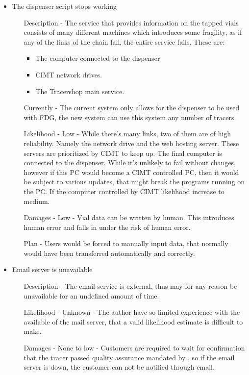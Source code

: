 \documentclass{article}
\begin{document}
\begin{itemize}
\begin{itemize}
  \end{itemize}
  \item The dispenser script stops working
  \begin{itemize}
    \item[Description] - The service that provides information on the tapped
    vials consists of many different machines which introduces some fragility,
    as if any of the links of the chain fail, the entire service fails.
    These are:
    \begin{itemize}
      \item The computer connected to the dispenser
      \item CIMT network drives.
      \item The Tracershop main service.
    \end{itemize}
    \item[Currently] - The current system only allows for the dispenser to be
    used with FDG, the new system can use this system any number of tracers.
    \item[Likelihood] - Low - While there's many links, two of them are of high
    reliability. Namely the network drive and the web hosting server. These
    servers are prioritized by CIMT to keep up.
    The final computer is connected to the dispenser. While it's unlikely to
    fail without changes, however if this PC would become a CIMT controlled PC,
    then it would be subject to various updates, that might break the programs
    running on the PC. If the computer controlled by CIMT likelihood increase to
    medium.
    \item[Damages] - Low - Vial data can be written by human. This introduces
    human error and falls in under the risk of human error.
    \item[Plan] - Users would be forced to manually input data, that normally
    would have been transferred automatically and correctly.
  \end{itemize}
  \item Email server is unavailable
  \begin{itemize}
    \item[Description] - The email service is external, thus may for any reason be unavailable for an undefined amount of time.
    \item[Likelihood] - Unknown - The author have so limited experience with the available of the mail server, that a valid likelihood estimate is difficult to make.
    \item[Damages] - None to low - Customers are required to wait for confirmation that the tracer passed quality assurance mandated by , so if the email server is down, the customer can not be notified through email.

\end{itemize}
\end{itemize}
\end{document}
